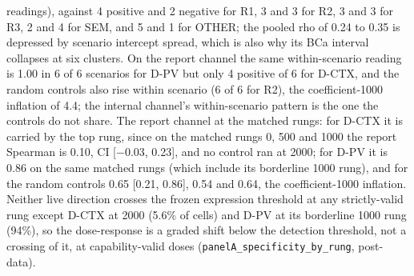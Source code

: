 \documentclass[11pt,a4paper]{article}
\begin{document}
readings), against 4 positive and 2 negative for R1, 3 and 3 for R2, 3 and 3 for R3, 2 and 4 for SEM, and 5 and 1 for OTHER; the pooled rho of 0.24 to 0.35 is depressed by scenario intercept spread, which is also why its BCa interval collapses at six clusters. On the report channel the same within-scenario reading is 1.00 in 6 of 6 scenarios for D-PV but only 4 positive of 6 for D-CTX, and the random controls also rise within scenario (6 of 6 for R2), the coefficient-1000 inflation of 4.4; the internal channel's within-scenario pattern is the one the controls do not share. The report channel at the matched rungs: for D-CTX it is carried by the top rung, since on the matched rungs 0, 500 and 1000 the report Spearman is 0.10, CI [$-$0.03, 0.23], and no control ran at 2000; for D-PV it is 0.86 on the same matched rungs (which include its borderline 1000 rung), and for the random controls 0.65 [0.21, 0.86], 0.54 and 0.64, the coefficient-1000 inflation. Neither live direction crosses the frozen expression threshold at any strictly-valid rung except D-CTX at 2000 (5.6\% of cells) and D-PV at its borderline 1000 rung (94\%), so the dose-response is a graded shift below the detection threshold, not a crossing of it, at capability-valid doses (\texttt{panelA\_specificity\_by\_rung}, post-data).
\end{document}
